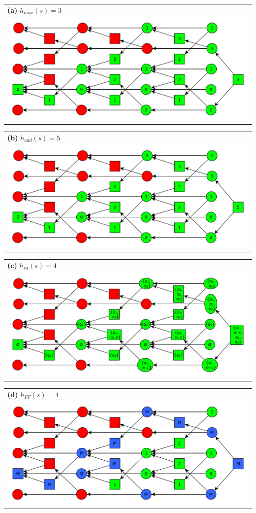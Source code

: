 \documentclass[11pt,a4paper]{article}
\begin{document}
\begin{tabular}{l} %
\textbf{(a)} $h_{max}(s)=3$\\
\includegraphics[scale=0.5]{g63a}\\
\end{tabular}

\begin{tabular}{l} %
\textbf{(b)} $h_{add}(s)=5$\\
\includegraphics[scale=0.5]{g63b}\\
\end{tabular}

\begin{tabular}{l} %
\textbf{(c)} $h_{sa}(s)=4$\\
\includegraphics[scale=0.5]{g63c}\\
\end{tabular}

\begin{tabular}{l} %
\textbf{(d)} $h_{FF}(s)=4$\\
\includegraphics[scale=0.5]{g63d}\\
\end{tabular}
\end{document}
